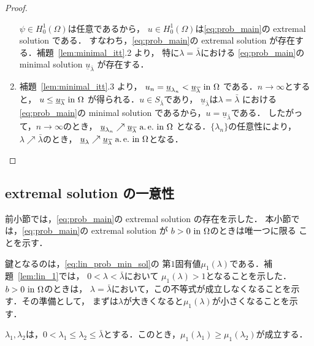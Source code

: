 \begin{proof}
\begin{enumerate}[1.]
\[        \]
        $\psi \in H_0^1(\Omega)$は任意であるから，
        $u \in H_0^1(\Omega)$は\ref{eq:prob_main}の extremal solution
        である．
        すなわち，\ref{eq:prob_main}の extremal solution
        が存在する．補題~\ref{lem:minimal_itt}.2 より，
        特に$\lambda = \bar{\lambda}$における
        \ref{eq:prob_main}の minimal solution 
        $\underline{u}_{\bar{\lambda}}$
        が存在する．
  \item 補題~\ref{lem:minimal_itt}.3 より，
        $u_n = \underline{u}_{\lambda_n} <
        \underline{u}_{\overline{\lambda}} ~\text{in}~ \Omega$
        である．$n \to \infty$とすると，
        $u \leq \underline{u}_{\overline{\lambda}} ~\text{in}~ \Omega$
        が得られる．$u \in S_{\bar{\lambda}}$であり，
        $\underline{u}_{\bar{\lambda}}$は$\lambda = \bar{\lambda}$
        における \ref{eq:prob_main}の minimal solution 
        であるから，$u = \underline{u}_{\bar{\lambda}}$である．
        したがって，$n \to \infty$のとき，
        $\underline{u}_{\lambda_n} \nearrow
        \underline{u}_{\overline{\lambda}} ~\text{a.\,e.}~ \text{in}~ \Omega$
        となる．$\{ \lambda_n \}$の任意性により，
        $\lambda \nearrow \bar{\lambda}$のとき，
        $\underline{u}_{\lambda} \nearrow
        \underline{u}_{\overline{\lambda}} ~\text{a.\,e.}~ \text{in}~ \Omega$となる．\qedhere
 \end{enumerate}
\end{proof}

\subsection{extremal solution の一意性}

前小節では，\ref{eq:prob_main}の extremal solution の存在を示した．
本小節では，\ref{eq:prob_main}の extremal solution が
$b > 0 ~\text{in}~ \Omega$のときは唯一つに限る
ことを示す．

鍵となるのは，\eqref{eq:lin_prob_min_sol}の
第$1$固有値$\mu_1(\lambda)$である．補題~\ref{lem:lin_1}では，
$0 < \lambda < \bar{\lambda}$において
$\mu_1(\lambda) > 1$となることを示した．
$b > 0 ~\text{in}~ \Omega$のときは，
$\lambda = \bar{\lambda}$において，この不等式が成立しなくなることを示
す．その準備として，
まずは$\lambda$が大きくなると$\mu_1(\lambda)$が小さくなることを示す．

\begin{lem} \label{rem:mu1_dec}
 $\lambda_1, \lambda_2$は，$0 < \lambda_1 \leq \lambda_2 \leq
 \bar{\lambda}$とする．このとき，$\mu_1(\lambda_1) \geq
 \mu_1(\lambda_2)$が成立する．
\end{lem}

